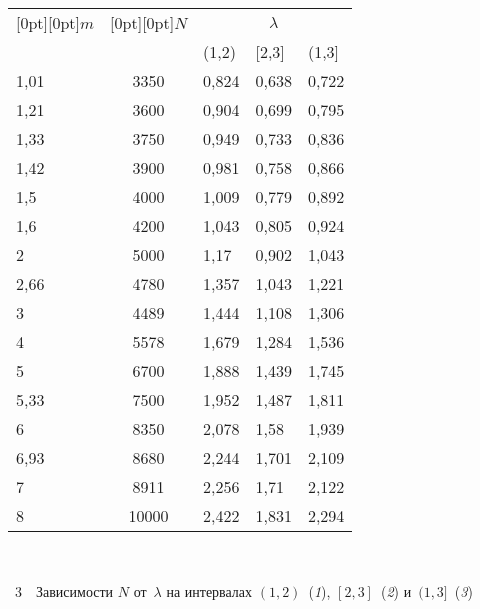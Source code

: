 \begin{multicols}{2}
{\begin{center}
{\small 
\tabcolsep=12.2pt
\begin{tabular}{|l|c|l|l|l|}
\hline
\multicolumn{1}{|c|}{\raisebox{-6pt}[0pt][0pt]{$m$}}& 
\multicolumn{1}{c|}{\raisebox{-6pt}[0pt][0pt]{$N$}}& \multicolumn{3}{c|}{$\lambda$}\\
\cline{3-5}
 &   & (1,2) & [2,3] & (1,3]\\ 
\hline
1,01 & 3350 & 0,824 & 0,638 & 0,722\\
1,21 & 3600 & 0,904 & 0,699 & 0,795\\
1,33 & 3750 & 0,949 & 0,733 & 0,836\\
1,42 & 3900 & 0,981 & 0,758 & 0,866\\
1,5 & 4000 & 1,009 & 0,779 & 0,892\\
1,6 & 4200 & 1,043 & 0,805 & 0,924\\
2 & 5000 & 1,17 & 0,902 & 1,043\\
2,66 & 4780 & 1,357 & 1,043 & 1,221\\
3 & 4489 & 1,444 & 1,108 & 1,306\\
4 & 5578 & 1,679 & 1,284 & 1,536\\
5 & 6700 & 1,888 & 1,439 & 1,745\\
5,33 & 7500 & 1,952 & 1,487 & 1,811\\
6 & 8350 & 2,078 & 1,58 & 1,939\\
6,93 & 8680 & 2,244 & 1,701 & 2,109\\
7 & 8911 & 2,256 & 1,71 & 2,122\\
8 & 10000\hphantom{9} & 2,422 & 1,831 & 2,294\\ 
\hline
\end{tabular}}
\end{center}
}

\vspace*{9pt}

 { \begin{center}  %
 \vspace*{-2pt}
  \mbox{%
 \epsfxsize=77.942mm 
 }


\end{center}


\noindent
{{\figurename~3}\ \ \small{Зависимости $N$ от~$\lambda$ на интервалах 
$(1,2)$~(\textit{1}), 
$[2,3]$~(\textit{2}) и~$(1,3]$~(\textit{3})}}
}

\vspace*{14pt}






\end{multicols}
